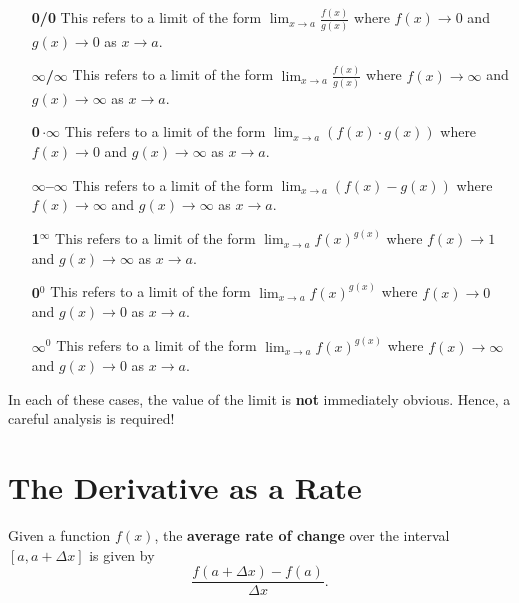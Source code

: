 \documentclass{ximera}
\begin{document}
\begin{definition}\hfil
\begin{itemize}
\item[\textbf{0/0}] This refers to a limit of the form $\lim_{x\to a}
\frac{f(x)}{g(x)}$ where $f(x)\to 0$ and $g(x)\to 0$ as $x\to a$.
\item[\textbf{$\pmb\infty$/$\pmb\infty$}] This refers to a limit of the form $\lim_{x\to a}
\frac{f(x)}{g(x)}$ where $f(x)\to \infty$ and $g(x)\to \infty$ as $x\to a$.
\item[\textbf{0\,$\pmb{\cdot\infty}$}] This refers to a limit of the form $\lim_{x\to a}
\left(f(x)\cdot g(x)\right)$ where $f(x)\to 0$ and $g(x)\to \infty$ as $x\to a$.
\item[\textbf{$\pmb\infty$--$\pmb\infty$}] This refers to a limit of the form $\lim_{x\to a}\left(
f(x)-g(x)\right)$ where $f(x)\to \infty$ and $g(x)\to \infty$ as $x\to a$.
\item[\textbf{1$^{\pmb\infty}$}] This refers to a limit of the form $\lim_{x\to a}
f(x)^{g(x)}$ where $f(x)\to 1$ and $g(x)\to \infty$ as $x\to a$.
\item[\textbf{0$^\text{0}$}] This refers to a limit of the form $\lim_{x\to a}
f(x)^{g(x)}$ where $f(x)\to 0$ and $g(x)\to 0$ as $x\to a$.
\item[\textbf{$\pmb\infty^\text{0}$}] This refers to a limit of the form $\lim_{x\to a}
f(x)^{g(x)}$ where $f(x)\to \infty$ and $g(x)\to 0$ as $x\to a$.
\end{itemize}
In each of these cases, the value of the limit is \textbf{not} immediately
obvious. Hence, a careful analysis is required!
\end{definition}







\section{The Derivative as a Rate}







\begin{definition}
Given a function $f(x)$, the \textbf{average rate of change} over the
interval $[a, a+\Delta x]$ is given by
\[
\frac{f(a+\Delta x) - f(a)}{\Delta x}.
\]
\end{definition}
\end{document}
